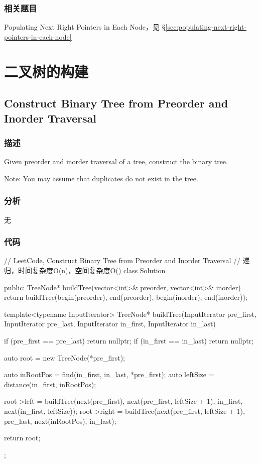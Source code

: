 \subsubsection{相关题目}
\begindot
\item Populating Next Right Pointers in Each Node，见 \S \ref{sec:populating-next-right-pointers-in-each-node}
\myenddot


\section{二叉树的构建} %


\subsection{Construct Binary Tree from Preorder and Inorder Traversal}
\label{sec:construct-binary-tree-from-preorder-and-inorder-traversal}


\subsubsection{描述}
Given preorder and inorder traversal of a tree, construct the binary tree.

Note:
You may assume that duplicates do not exist in the tree.


\subsubsection{分析}
无


\subsubsection{代码}
\begin{Code}
// LeetCode, Construct Binary Tree from Preorder and Inorder Traversal
// 递归，时间复杂度O(n)，空间复杂度O(\logn)
class Solution {
public:
    TreeNode* buildTree(vector<int>& preorder, vector<int>& inorder) {
        return buildTree(begin(preorder), end(preorder),
                begin(inorder), end(inorder));
    }

    template<typename InputIterator>
    TreeNode* buildTree(InputIterator pre_first, InputIterator pre_last,
            InputIterator in_first, InputIterator in_last) {
        if (pre_first == pre_last) return nullptr;
        if (in_first == in_last) return nullptr;

        auto root = new TreeNode(*pre_first);

        auto inRootPos = find(in_first, in_last, *pre_first);
        auto leftSize = distance(in_first, inRootPos);

        root->left = buildTree(next(pre_first), next(pre_first,
                leftSize + 1), in_first, next(in_first, leftSize));
        root->right = buildTree(next(pre_first, leftSize + 1), pre_last,
                next(inRootPos), in_last);

        return root;
    }
};
\end{Code}


